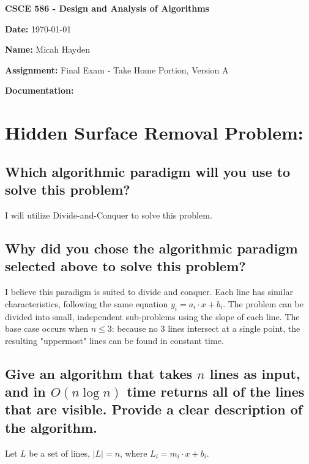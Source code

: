 \documentclass{article}
\begin{document}
\noindent \textbf{CSCE 586 - Design and Analysis of Algorithms}

\noindent \textbf{Date:}  \today 

\noindent \textbf{Name:}  Micah Hayden

\noindent \textbf{Assignment:}  Final Exam - Take Home Portion, Version A

\noindent \textbf{Documentation:} 

\hrulefill

\section{Hidden Surface Removal Problem:}
\subsection{Which algorithmic paradigm will you use to solve this problem?}  
I will utilize Divide-and-Conquer to solve this problem.

\subsection{Why did you chose the algorithmic paradigm selected above to solve this problem?}
I believe this paradigm is suited to divide and conquer.  Each line has similar characteristics, following the same equation $y_i = a_i \cdot x + b_i$.  The problem can be divided into small, independent sub-problems using the slope of each line.  The base case occurs when $n \leq 3$:  because no 3 lines intersect at a single point, the resulting "uppermost" lines can be found in constant time.
 
\subsection{Give an algorithm that takes $n$ lines as input, and in $O(n \log{n})$ time returns all of the lines that are visible.  Provide a clear description of the algorithm.}

Let $L$ be a set of lines, $|L|=n$, where $L_i=m_i \cdot x + b_i$.
\end{document}
